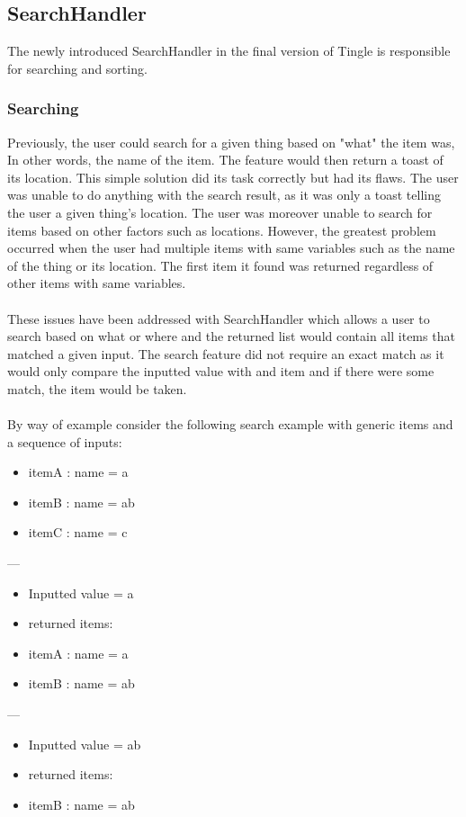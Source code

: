 \documentclass{article}
\begin{document}
\subsection{SearchHandler} \label{searchhandlersection}
The newly introduced SearchHandler in the final version of Tingle is responsible for searching and sorting.

\subsubsection{Searching}Previously, the user could search for a given thing based on "what" the item was, In other words, the name of the item. The feature would then return a toast of its location. This simple solution did its task correctly but had its flaws. The user was unable to do anything with the search result, as it was only a toast telling the user a given thing's location. The user was moreover unable to search for items based on other factors such as locations. However, the greatest problem occurred when the user had multiple items with same variables such as the name of the thing or its location. The first item it found was returned regardless of other items with same variables. \\\\These issues have been addressed with SearchHandler which allows a user to search based on what or where and the returned list would contain all items that matched a given input. The search feature did not require an exact match as it would only compare the inputted value with and item and if there were some match, the item would be taken. \\\\By way of example consider the following search example with  generic items and a sequence of inputs:
\begin{itemize}
	\item itemA : name = a 
	\item itemB : name = ab
	\item itemC : name = c
\end{itemize}
---
\begin{itemize}
	\item Inputted value = a
	\item returned items:
	\item itemA : name = a 
	\item itemB : name = ab
\end{itemize}
---
\begin{itemize}
	\item Inputted value = ab
	\item returned items:
	\item itemB : name = ab
\end{itemize}
\end{document}
